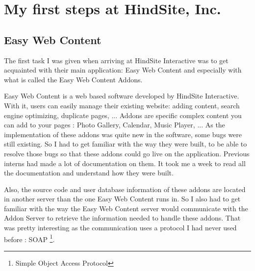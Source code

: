 \chapter{My first steps at HindSite, Inc. }

\section{Easy Web Content}

The first task I was given when arriving at HindSite Interactive was to get acquainted with their main application: Easy Web Content and especially with what is called the Easy Web Content Addons.

Easy Web Content is a web based software developed by HindSite Interactive. With it, users can easily manage their existing website: adding content, search engine optimizing, duplicate pages, ... Addons are specific complex content you can add to your pages : Photo Gallery, Calendar, Music Player, ... As the implementation of these addons was quite new in the software, some bugs were still existing. So I had to get familiar with the way they were built, to be able to resolve those bugs so that these addons could go live on the application. Previous interns had made a lot of documentation on them. It took me a week to read all the documentation and understand how they were built.

Also, the source code and user database information of these addons are located in another server than the one Easy Web Content runs in. So I also had to get familiar with the way the Easy Web Content server would communicate with the Addon Server to retrieve the information needed to handle these addons. That was pretty interesting as the communication uses a protocol I had never used before : SOAP \footnote{Simple Object Access Protocol}.


